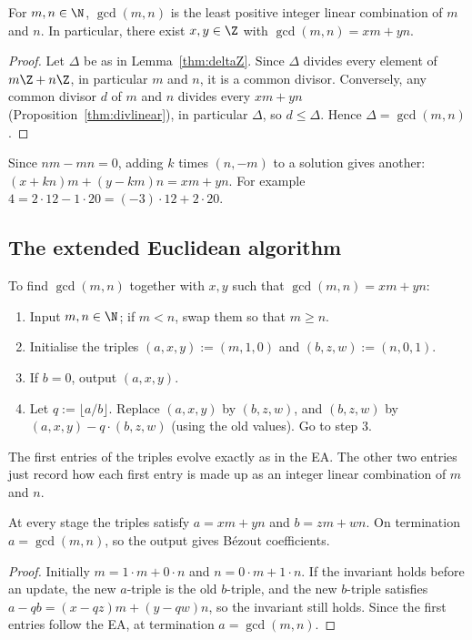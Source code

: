 \begin{theorem}[Bézout]
\label{thm:bezout}
For $m,n\in\N$, $\gcd(m,n)$ is the least positive integer linear combination of $m$ and $n$. In particular, there exist $x,y\in\Z$ with $\gcd(m,n)=xm+yn$.
\end{theorem}
\begin{proof}
Let $\Delta$ be as in Lemma~\ref{thm:deltaZ}. Since $\Delta$ divides every element of $m\Z+n\Z$, in particular $m$ and $n$, it is a common divisor. Conversely, any common divisor $d$ of $m$ and $n$ divides every $xm+yn$ (Proposition~\ref{thm:divlinear}), in particular $\Delta$, so $d\le\Delta$. Hence $\Delta=\gcd(m,n)$.
\end{proof}

\begin{note}
Since $nm-mn=0$, adding $k$ times $(n,-m)$ to a solution gives another: $(x+kn)m+(y-km)n = xm+yn$. For example $4=2\cdot12-1\cdot20=(-3)\cdot12+2\cdot20$.
\end{note}

\subsection{The extended Euclidean algorithm}
\label{sec:7-8}

\begin{definition}
To find $\gcd(m,n)$ together with $x,y$ such that $\gcd(m,n)=xm+yn$:
\begin{enumerate}
    \item Input $m,n\in\N$; if $m<n$, swap them so that $m\ge n$.
    \item Initialise the triples $(a,x,y):=(m,1,0)$ and $(b,z,w):=(n,0,1)$.
    \item If $b=0$, output $(a,x,y)$.
    \item Let $q:=\lfloor a/b\rfloor$. Replace $(a,x,y)$ by $(b,z,w)$, and $(b,z,w)$ by $(a,x,y)-q\cdot(b,z,w)$ (using the old values). Go to step 3.
\end{enumerate}
\end{definition}

\begin{note}
The first entries of the triples evolve exactly as in the EA. The other two entries just record how each first entry is made up as an integer linear combination of $m$ and $n$.
\end{note}

\begin{theorem}
\label{thm:eea}
At every stage the triples satisfy $a=xm+yn$ and $b=zm+wn$. On termination $a=\gcd(m,n)$, so the output gives Bézout coefficients.
\end{theorem}
\begin{proof}
Initially $m=1\cdot m+0\cdot n$ and $n=0\cdot m+1\cdot n$. If the invariant holds before an update, the new $a$-triple is the old $b$-triple, and the new $b$-triple satisfies $a-qb = (x-qz)m+(y-qw)n$, so the invariant still holds. Since the first entries follow the EA, at termination $a=\gcd(m,n)$.
\end{proof}


